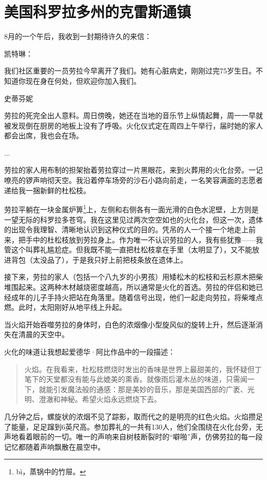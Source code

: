 \documentclass[12pt,oneside]{book}
\begin{document}
\section{美国科罗拉多州的克雷斯通镇}
\begin{bookref}[frametitle={\cite{好好告别：世界葬礼观察手记}}]
8月的一个午后，我收到一封期待许久的来信：

凯特琳：

我们社区重要的一员劳拉今早离开了我们。她有心脏病史，刚刚过完75岁生日。不知道你现在身在何处，但欢迎你加入我们。

史蒂芬妮

劳拉的死完全出人意料。周日傍晚，她还在当地的音乐节上纵情起舞，周一一早就被发现倒在厨房的地板上没有了呼吸。火化仪式定在周四上午举行，届时她的家人都会出席，我也会在场。

...

劳拉的家人用布制的担架抬着劳拉穿过一片黑眼花，来到火葬用的火化台旁。一记嘹亮的锣声响彻天空。我沿着停车场旁的沙石小路向前走，一名笑容满面的志愿者递给我一捆新鲜的杜松枝。

劳拉平躺在一块金属炉箅\footnote{bì，蒸锅中的竹屉。}上，左侧和右侧各有一面光滑的白色水泥壁，上方则是一望无际的科罗拉多苍穹。我在这里见过两次空空如也的火化台，但这一次，遗体的出现令我理智、清晰地认识到这种仪式的目的。凭吊的人一个接一个地走上前来，把手中的杜松枝放到劳拉身上。作为唯一不认识劳拉的人，我有些犹豫——我管这个叫葬礼尴尬症。但我既不能一直把杜松枝拿在手里（太明显了），又不能放进背包（太没品了），于是我只好上前把枝条放在遗体上。

接下来，劳拉的家人（包括一个八九岁的小男孩）用矮松木的松枝和云杉原木把柴堆围起来。这两种木材越烧密度越高，所以通常是火化的首选。劳拉的伴侣和她已经成年的儿子手持火把站在角落里。随着信号出现，他们一起走向劳拉，将柴堆点燃。此时，太阳刚好从地平线上升起。

当火焰开始吞噬劳拉的身体时，白色的浓烟像小型旋风似的旋转上升，然后逐渐消失在清晨的天空中。

火化的味道让我想起爱德华·阿比作品中的一段描述：

\begin{quotation}
火焰。在我看来，杜松枝燃烧时发出的香味是世界上最甜美的，我怀疑但丁笔下的天堂都没有能与此媲美的熏香。就像雨后灌木丛的味道，只需闻一下，就能引发魔法般的通感：那是美妙的音乐，那是美国西部的广袤、光明、澄澈和神秘。希望火焰永远燃烧下去。
\end{quotation}

几分钟之后，螺旋状的浓烟不见了踪影，取而代之的是明亮的红色火焰。火焰攒足了能量，足足蹿到6英尺高。参加葬礼的一共有130人，他们全围绕在火化台旁，无声地看着眼前的一切。唯一的声响来自树枝断裂时的“噼啪”声，仿佛劳拉的每一段记忆都随着声响飘散在晨空中。


\end{bookref}
\end{document}
